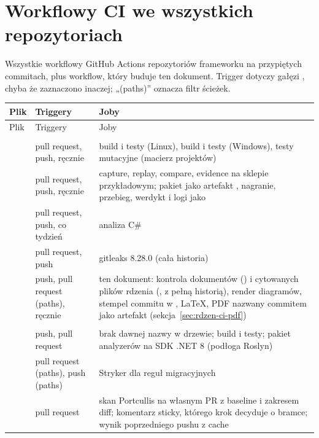 \section{Workflowy CI we wszystkich repozytoriach}\label{app:ci}

Wszystkie workflowy GitHub Actions repozytoriów frameworku na przypiętych commitach, plus
workflow, który buduje ten dokument. Trigger  dotyczy gałęzi
, chyba że zaznaczono inaczej; „(paths)” oznacza filtr ścieżek.

\begin{xltabular}{\linewidth}{@{}>{\raggedright\arraybackslash}p{3.1cm} >{\raggedright\arraybackslash}p{4.1cm} >{\raggedright\arraybackslash}X@{}}
\toprule
Plik & Triggery & Joby \\
\midrule
\endfirsthead
\toprule
Plik & Triggery & Joby \\
\midrule
\endhead
{} \\
 & pull request, push, ręcznie & build i testy (Linux), build i testy (Windows), testy mutacyjne (macierz projektów) \\
 & pull request, push, ręcznie & capture, replay, compare, evidence na sklepie przykładowym; pakiet jako artefakt , nagranie, przebieg, werdykt i logi jako  \\
 & pull request, push, co tydzień & analiza C\# \\
 & pull request, push & gitleaks 8.28.0 (cała historia) \\
 & push, pull request (paths), ręcznie & ten dokument: kontrola dokumentów () i cytowanych plików rdzenia (, z pełną historią), render diagramów, stempel commitu w , LaTeX, PDF nazwany commitem jako artefakt  (sekcja~\ref{sec:rdzen-ci-pdf}) \\
\midrule
{} \\
 & push, pull request & brak dawnej nazwy w drzewie; build i testy; pakiet analyzerów na SDK .NET 8 (podłoga Roslyn) \\
 & pull request (paths), push (paths) & Stryker dla reguł migracyjnych \\
 & pull request & skan Portcullis na własnym PR z baseline i zakresem diff; komentarz sticky, którego krok decyduje o bramce; wynik poprzedniego pushu z cache \\

\end{xltabular}
